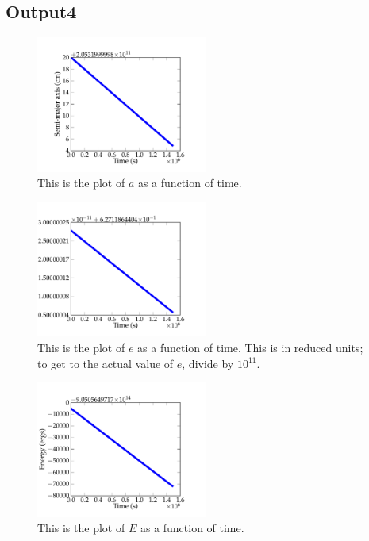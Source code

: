 \documentclass[11pt,letterpaper]{article}
\begin{document}
\subsection{Output4}

\begin{figure}[bth]
\centering
\includegraphics[width=0.5\textwidth]{output4_figs/semi-major_axis.pdf}
\caption{This is the plot of $a$ as a function of time.}
\label{fig:simpleplot2}
\end{figure}

\begin{figure}[bth]
\centering
\includegraphics[width=0.5\textwidth]{output4_figs/eccentricity.pdf}
\caption{This is the plot of $e$ as a function of time. This is in reduced units; to get to the actual value of $e$, divide by $10^{11}$.}
\label{fig:simpleplot2}
\end{figure}

\begin{figure}[bth]
\centering
\includegraphics[width=0.5\textwidth]{output4_figs/energy.pdf}
\caption{This is the plot of $E$ as a function of time.}
\label{fig:simpleplot2}
\end{figure}
\end{document}
